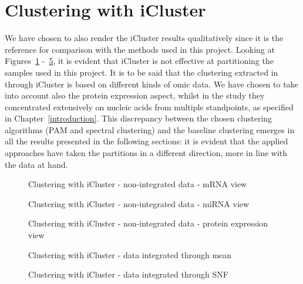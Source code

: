 \section{Clustering with iCluster}\label{results_iCluster}
We have chosen to also render the iCluster results qualitatively since it is the reference for comparison with the methods used in this project. Looking at Figures~\ref{fig:iCluster_1} -~\ref{fig:iCluster_SNF}, it is evident that iCluster is not effective at partitioning the samples used in this project. It is to be said that the clustering extracted in~\cite{abeshouse2015molecularPRAD} through iCluster is based on different kinds of omic data. We have chosen to take into account also the protein expression aspect, whilst in the study they concentrated extensively on nucleic acids from multiple standpoints, as specified in Chapter~\ref{introduction}. This discrepancy between the chosen clustering algorithms (PAM and spectral clustering) and the baseline clustering emerges in all the results presented in the following sections: it is evident that the applied approaches have taken the partitions in a different direction, more in line with the data at hand.
\begin{figure}[!]
    \centering
    \caption{Clustering with iCluster - non-integrated data - mRNA view}
    \label{fig:iCluster_1}
\end{figure}
\begin{figure}[!]
    \centering
    \caption{Clustering with iCluster - non-integrated data - miRNA view}
    \label{fig:iCluster_2}
\end{figure}
\begin{figure}[!]
    \centering
    \caption{Clustering with iCluster - non-integrated data - protein expression view}
    \label{fig:iCluster_3}
\end{figure}
\begin{figure}[!]
    \centering
    \caption{Clustering with iCluster - data integrated through mean}
    \label{fig:iCluster_mean}
\end{figure}
\begin{figure}[!]
    \centering
    \caption{Clustering with iCluster - data integrated through SNF}
    \label{fig:iCluster_SNF}
\end{figure}

